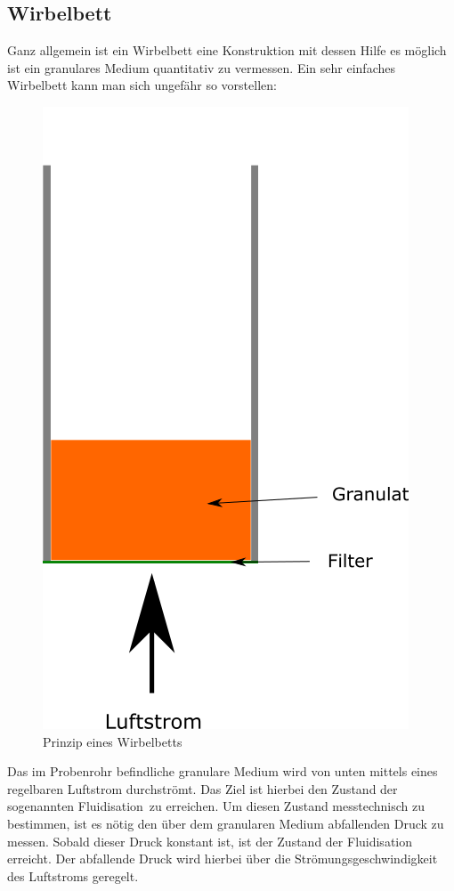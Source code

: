 \subsection{Wirbelbett}

Ganz allgemein ist ein Wirbelbett eine Konstruktion mit dessen Hilfe es möglich ist ein granulares Medium quantitativ zu vermessen. Ein sehr einfaches Wirbelbett kann man sich ungefähr so vorstellen:


\begin{figure}[h]
		\begin{center}

		\includegraphics[scale=0.45]{Prinzip_Wirbelbett.png}
		\caption{Prinzip eines Wirbelbetts}
	\end{center}
\end{figure}	


Das im Probenrohr befindliche granulare Medium wird von unten mittels eines regelbaren Luftstrom durchströmt. Das Ziel ist hierbei den Zustand der sogenannten \glqq Fluidisation\grqq \ zu erreichen. Um diesen Zustand messtechnisch zu bestimmen, ist es nötig den über dem granularen Medium abfallenden Druck zu messen. Sobald dieser Druck konstant ist, ist der Zustand der Fluidisation erreicht. Der abfallende Druck wird hierbei über die Strömungsgeschwindigkeit des Luftstroms geregelt.


